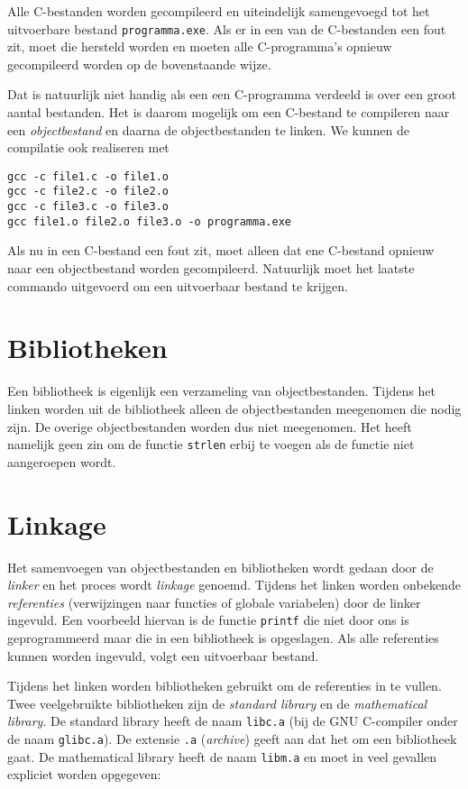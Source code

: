 Alle C-bestanden worden gecompileerd en uiteindelijk samengevoegd tot het uitvoerbare bestand \texttt{programma.exe}.
Als er in een van de C-bestanden een fout zit, moet die hersteld worden en moeten alle C-programma's opnieuw gecompileerd worden op de bovenstaande wijze.

Dat is natuurlijk niet handig als een een C-programma verdeeld is over een groot aantal bestanden. Het is daarom mogelijk om een C-bestand te compileren naar een \textsl{objectbestand} en daarna de objectbestanden te linken. We kunnen de compilatie ook realiseren met

\begin{lstlisting}[style=lstoneline]
gcc -c file1.c -o file1.o
gcc -c file2.c -o file2.o
gcc -c file3.c -o file3.o
gcc file1.o file2.o file3.o -o programma.exe
\end{lstlisting}

Als nu in een C-bestand een fout zit, moet alleen dat ene C-bestand opnieuw naar een objectbestand worden gecompileerd. Natuurlijk moet het laatste commando uitgevoerd om een uitvoerbaar bestand te krijgen.


\section{Bibliotheken}
Een bibliotheek is eigenlijk een verzameling van objectbestanden. Tijdens het linken worden uit de bibliotheek alleen de objectbestanden meegenomen die nodig zijn. De overige objectbestanden worden dus niet meegenomen. Het heeft namelijk geen zin om de functie \texttt{strlen} erbij te voegen als de functie niet aangeroepen wordt.


\section{Linkage}
\label{sec:comlinkage}
Het samenvoegen van objectbestanden en bibliotheken wordt gedaan door de \textsl{linker} en het proces wordt \textsl{linkage} genoemd. Tijdens het linken worden onbekende \textsl{referenties} (verwijzingen naar functies of globale variabelen) door de linker ingevuld. Een voorbeeld hiervan is de functie \texttt{printf} die niet door ons is geprogrammeerd maar die in een bibliotheek is opgeslagen. Als alle referenties kunnen worden ingevuld, volgt een uitvoerbaar bestand.

Tijdens het linken worden bibliotheken gebruikt om de referenties in te vullen. 
Twee veelgebruikte bibliotheken zijn de \textsl{standard library} en de \textsl{mathematical library}. De standard library heeft de naam \texttt{libc.a} (bij de GNU C-compiler onder de naam \texttt{glibc.a}). De extensie \texttt{.a} (\textsl{archive}) geeft aan dat het om een bibliotheek gaat. De mathematical library heeft de naam \texttt{libm.a} en moet in veel gevallen expliciet worden opgegeven:

